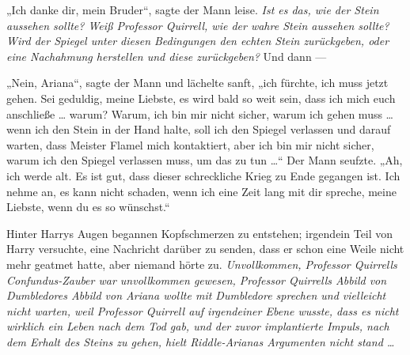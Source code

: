 „Ich danke dir, mein Bruder“, sagte der Mann leise.
\emph{Ist es das, wie der Stein aussehen sollte? Weiß Professor Quirrell, wie der wahre Stein aussehen sollte? Wird der Spiegel unter diesen Bedingungen den echten Stein zurückgeben, oder eine Nachahmung herstellen und diese zurückgeben?}
Und dann —

„Nein, Ariana“, sagte der Mann und lächelte sanft, „ich fürchte, ich muss jetzt gehen. Sei geduldig, meine Liebste, es wird bald so weit sein, dass ich mich euch anschließe … warum? Warum, ich bin mir nicht sicher, warum ich gehen muss … wenn ich den Stein in der Hand halte, soll ich den Spiegel verlassen und darauf warten, dass Meister Flamel mich kontaktiert, aber ich bin mir nicht sicher, warum ich den Spiegel verlassen muss, um das zu tun …“
Der Mann seufzte.
„Ah, ich werde alt. Es ist gut, dass dieser schreckliche Krieg zu Ende gegangen ist. Ich nehme an, es kann nicht schaden, wenn ich eine Zeit lang mit dir spreche, meine Liebste, wenn du es so wünschst.“

Hinter Harrys Augen begannen Kopfschmerzen zu entstehen; irgendein Teil von Harry versuchte, eine Nachricht darüber zu senden, dass er schon eine Weile nicht mehr geatmet hatte, aber niemand hörte zu. \emph{Unvollkommen, Professor Quirrells Confundus-Zauber war unvollkommen gewesen, Professor Quirrells Abbild von Dumbledores Abbild von Ariana wollte mit Dumbledore sprechen und vielleicht nicht warten, weil Professor Quirrell auf irgendeiner Ebene wusste, dass es nicht wirklich ein Leben nach dem Tod gab, und der zuvor implantierte Impuls, nach dem Erhalt des Steins zu gehen, hielt Riddle-Arianas Argumenten nicht stand …}

